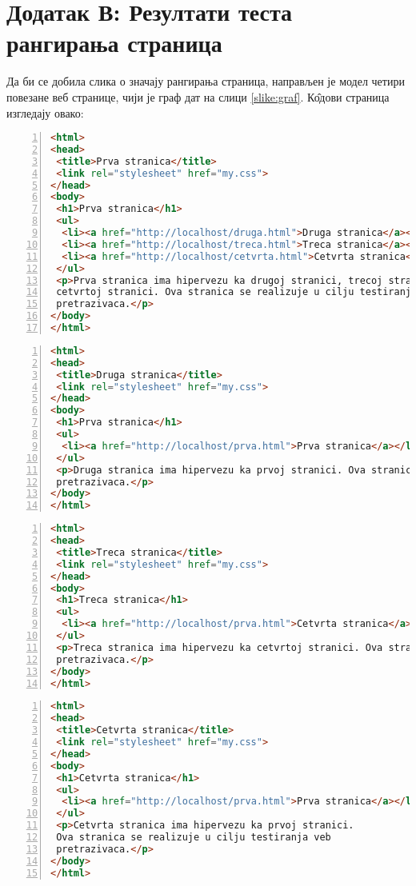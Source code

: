 \section{Додатак В: Резултати теста рангирања страница}\label{sec:dodatakc}
		Да би се добила слика о значају рангирања страница, направљен је модел четири повезане веб странице, чији је граф дат на слици \ref{slike:graf}. К\^{о}дови страница изгледају овако:\\

\begin{lstlisting}[language=HTML, caption=K\^{о}д прве странице, label={lst:prva}, numbers=left]
<html>
<head>
 <title>Prva stranica</title>
 <link rel="stylesheet" href="my.css">
</head>
<body>
 <h1>Prva stranica</h1>
 <ul>
  <li><a href="http://localhost/druga.html">Druga stranica</a></li>
  <li><a href="http://localhost/treca.html">Treca stranica</a></li>
  <li><a href="http://localhost/cetvrta.html">Cetvrta stranica</a></li>
 </ul>
 <p>Prva stranica ima hipervezu ka drugoj stranici, trecoj stranici,
 cetvrtoj stranici. Ova stranica se realizuje u cilju testiranja veb
 pretrazivaca.</p>
</body>
</html>
\end{lstlisting}%
\medskip

\begin{lstlisting}[language=HTML, caption=K\^{о}д друге странице, label={lst:druga}, numbers=left]
<html>
<head>
 <title>Druga stranica</title>
 <link rel="stylesheet" href="my.css">
</head>
<body>
 <h1>Prva stranica</h1>
 <ul>
  <li><a href="http://localhost/prva.html">Prva stranica</a></li>
 </ul>
 <p>Druga stranica ima hipervezu ka prvoj stranici. Ova stranica se realizuje u cilju testiranja veb
 pretrazivaca.</p>
</body>
</html>
\end{lstlisting}%

\begin{lstlisting}[language=HTML, caption=K\^{о}д треће странице, label={lst:treca}, numbers=left]
<html>
<head>
 <title>Treca stranica</title>
 <link rel="stylesheet" href="my.css">
</head>
<body>
 <h1>Treca stranica</h1>
 <ul>
  <li><a href="http://localhost/prva.html">Cetvrta stranica</a></li>
 </ul>
 <p>Treca stranica ima hipervezu ka cetvrtoj stranici. Ova stranica se realizuje u cilju testiranja veb
 pretrazivaca.</p>
</body>
</html>
\end{lstlisting}%

\begin{lstlisting}[language=HTML, caption=K\^{о}д четврте странице, label={lst:prva}, numbers=left]
<html>
<head>
 <title>Cetvrta stranica</title>
 <link rel="stylesheet" href="my.css">
</head>
<body>
 <h1>Cetvrta stranica</h1>
 <ul>
  <li><a href="http://localhost/prva.html">Prva stranica</a></li>
 </ul>
 <p>Cetvrta stranica ima hipervezu ka prvoj stranici.
 Ova stranica se realizuje u cilju testiranja veb
 pretrazivaca.</p>
</body>
</html>
\end{lstlisting}

